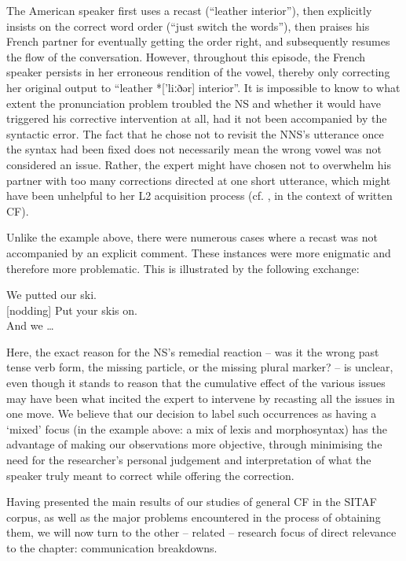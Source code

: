 \documentclass[output=paper,colorlinks,citecolor=brown,modfonts,nonflat]{../langscibook}
\begin{document}
The American speaker first uses a recast (“leather interior”), then explicitly insists on the correct word order (“just switch the words”), then praises his French partner for eventually getting the order right, and subsequently resumes the flow of the conversation. However, throughout this episode, the French speaker persists in her erroneous rendition of the vowel, thereby only correcting her original output to “leather *['liːðər] interior”. It is impossible to know to what extent the pronunciation problem troubled the NS and whether it would have triggered his corrective intervention at all, had it not been accompanied by the syntactic error. The fact that he chose not to revisit the NNS’s utterance once the syntax had been fixed does not necessarily mean the wrong vowel was not considered an issue. Rather, the expert might have chosen not to overwhelm his partner with too many corrections directed at one short utterance, which might have been unhelpful to her L2 acquisition process (cf. \citealt{EllisEtAl2008}, in the context of written CF).



Unlike the example above, there were numerous cases where a recast was not accompanied by an explicit comment. These instances were more enigmatic and therefore more problematic. This is illustrated by the following exchange:


\ea\label{ex:scheuer:12}
{\NNS} {We} {putted} {our} {ski.}\\
{\NS} [nodding] {Put} {your} {skis} {on.}\\
{\NNS} {And} {we} {…}
\z


Here, the exact reason for the NS’s remedial reaction – was it the wrong past tense verb form, the missing particle, or the missing plural marker? – is unclear, even though it stands to reason that the cumulative effect of the various issues may have been what incited the expert to intervene by recasting all the issues in one move. We believe that our decision to label such occurrences as having a ‘mixed’ focus (in the example above: a mix of lexis and morphosyntax) has the advantage of making our observations more objective, through minimising the need for the researcher’s personal judgement and interpretation of what the speaker truly meant to correct while offering the correction. 



Having presented the main results of our studies of general CF in the SITAF corpus, as well as the major problems encountered in the process of obtaining them, we will now turn to the other – related – research focus of direct relevance to the chapter: communication breakdowns. 
\end{document}
